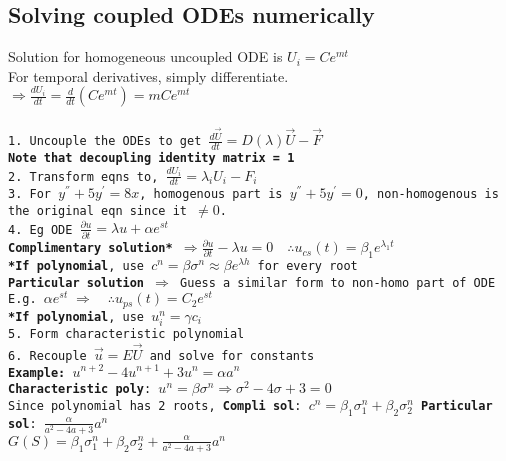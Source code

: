 \documentclass[8pt]{extarticle} %
\begin{document}
\begin{multicols*}{3}
  \subsection{Solving coupled ODEs numerically}
  Solution for homogeneous uncoupled ODE is $U_i=Ce^{mt}$\\
  For temporal derivatives, simply differentiate.\\
  $\Rightarrow\frac{dU_i}{dt}=\frac{d}{dt}(Ce^{mt}) = mCe^{mt}$\\
  \vspace{1ex}\\
  \tt1. Uncouple the ODEs to get $\frac{d\vec{U}}{dt}=D(\lambda)\vec{U}-\vec{F}$\\
  \textbf{Note that decoupling identity matrix = 1}\\
  \tt2. Transform eqns to, $\frac{dU_i}{dt}=\lambda_iU_i-F_i$\\
  \tt3. For $y^{''}+5y^{'}=8x$, homogenous part is $y^{''}+5y^{'}=0$, non-homogenous is the original eqn since it $\neq 0$.\\
  \tt4. Eg ODE $\frac{\partial u}{\partial t}=\lambda u+\alpha e^{st}$\\
  \textbf{Complimentary solution*} $\Rightarrow \frac{\partial u}{\partial t}-\lambda u = 0\quad\therefore u_{cs}(t)=\beta_1e^{\lambda_1t}$ \\
  \textbf{*If polynomial}, use $c^n=\beta\sigma^n \approx \beta e^{\lambda h}$ for every root\\
  \textbf{Particular solution} $\Rightarrow$ Guess a similar form to non-homo part of ODE E.g. $\alpha e^{st}\;\Rightarrow\quad\therefore u_{ps}(t)=C_2e^{st}$\\
  \textbf{*If polynomial}, use $u^n_i=\gamma c_i$\\
  \tt5. Form characteristic polynomial\\
  \tt6. Recouple $\vec{u}=E\vec{U}$ and solve for constants\\
  \vspace{0.5ex}
  \textbf{Example:} $u^{n+2}-4u^{n+1}+3u^n=\alpha a^n$\\
  \textbf{Characteristic poly}: $u^n=\beta \sigma^n \Rightarrow \sigma^2-4\sigma+3=0$\\
  Since polynomial has 2 roots, \textbf{Compli sol}: $c^{n}=\beta_{1}\sigma^n_1+\beta_{2}\sigma^n_2$
  \textbf{Particular sol}: $\frac{\alpha}{a^2-4a+3}a^n$\\
  $G(S) = \beta_{1}\sigma^n_1+\beta_{2}\sigma^n_2+\frac{\alpha}{a^2-4a+3}a^n$\\
  \vspace{0.5ex}
  \vspace{1ex}

\end{multicols*}
\end{document}
